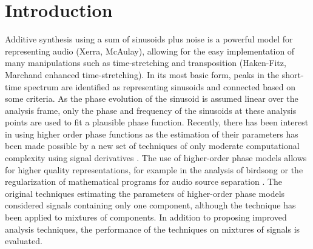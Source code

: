 \documentclass[twoside,a4paper]{article}
\title{\papertitle}
\newif\ifpdf
\begin{document}
\ifpdf %
  \DeclareGraphicsExtensions{.png,.jpg,.pdf}
\else  %
\fi

\maketitle

\begin{abstract}
TODO
\end{abstract}

\section{Introduction}
\label{sec:intro}
Additive synthesis using a sum of sinusoids plus noise is a powerful model for
representing audio (Xerra, McAulay), allowing for the easy implementation of
many manipulations such as time-stretching and transposition (Haken-Fitz,
Marchand enhanced time-stretching).
In its most basic form, peaks in the
short-time spectrum are identified as representing sinusoids and connected based
on some criteria. As the phase evolution of the sinusoid is assumed linear over
the analysis frame, only the phase and frequency of the sinusoids at these
analysis points are used to fit a plausible phase function. Recently, there has
been interest in using higher order phase functions \cite{xuepiecewise} as the estimation of
their parameters has been made possible by a new set of techniques of only
moderate computational complexity using signal derivatives \cite{hamilton2011non}.  The use
of higher-order phase models allows for higher quality representations, for
example in the analysis of birdsong \cite{stowell2013improved} or the
regularization of mathematical programs for audio source separation \cite{creager2016musicalsource}.
The original techniques estimating the parameters of higher-order phase models
considered signals containing only one component, although the technique
has been applied to mixtures of components. In addition to proposing improved
analysis techniques, the performance of the techniques on mixtures of signals is
evaluated.

%
%
%
\end{document}
